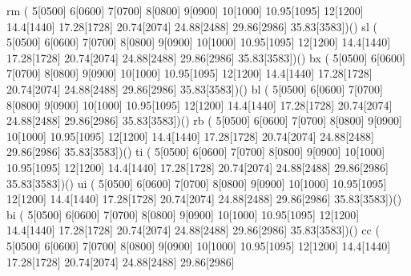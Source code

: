      \makefont\fonttwoletters rm   %
                          ( 5[0500] 6[0600] 7[0700] 8[0800] 9[0900]
                           10[1000] 10.95[1095] 12[1200] 14.4[1440]
                           17.28[1728] 20.74[2074] 24.88[2488] 29.86[2986]
                           35.83[3583])()
     \makefont\fonttwoletters sl   %
                          ( 5[0500] 6[0600] 7[0700] 8[0800] 9[0900]
                           10[1000] 10.95[1095] 12[1200] 14.4[1440]
                           17.28[1728] 20.74[2074] 24.88[2488] 29.86[2986]
                           35.83[3583])()
     \makefont\fonttwoletters bx   %
                          ( 5[0500] 6[0600] 7[0700] 8[0800] 9[0900]
                           10[1000] 10.95[1095] 12[1200] 14.4[1440]
                           17.28[1728] 20.74[2074] 24.88[2488] 29.86[2986]
                           35.83[3583])()
     \makefont\fonttwoletters bl   %
                          ( 5[0500] 6[0600] 7[0700] 8[0800] 9[0900]
                           10[1000] 10.95[1095] 12[1200] 14.4[1440]
                           17.28[1728] 20.74[2074] 24.88[2488] 29.86[2986]
                           35.83[3583])()
     \makefont\fonttwoletters rb   %
                          ( 5[0500] 6[0600] 7[0700] 8[0800] 9[0900]
                           10[1000] 10.95[1095] 12[1200] 14.4[1440]
                           17.28[1728] 20.74[2074] 24.88[2488] 29.86[2986]
                           35.83[3583])()
     \makefont\fonttwoletters ti   %
                          ( 5[0500] 6[0600] 7[0700] 8[0800] 9[0900]
                           10[1000] 10.95[1095] 12[1200] 14.4[1440]
                           17.28[1728] 20.74[2074] 24.88[2488] 29.86[2986]
                           35.83[3583])()
     \makefont\fonttwoletters ui   %
                          ( 5[0500] 6[0600] 7[0700] 8[0800] 9[0900]
                           10[1000] 10.95[1095] 12[1200] 14.4[1440]
                           17.28[1728] 20.74[2074] 24.88[2488] 29.86[2986]
                           35.83[3583])()
     \makefont\fonttwoletters bi   %
                          ( 5[0500] 6[0600] 7[0700] 8[0800] 9[0900]
                           10[1000] 10.95[1095] 12[1200] 14.4[1440]
                           17.28[1728] 20.74[2074] 24.88[2488] 29.86[2986]
                           35.83[3583])()
     \makefont\fonttwoletters cc   %
                          ( 5[0500] 6[0600] 7[0700] 8[0800] 9[0900]
                           10[1000] 10.95[1095] 12[1200] 14.4[1440]
                           17.28[1728] 20.74[2074] 24.88[2488] 29.86[2986]
